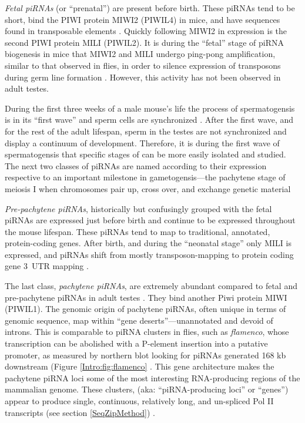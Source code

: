{    \textit{Fetal piRNAs} (or ``prenatal'') are present before birth. These piRNAs tend to be short, bind the PIWI protein MIWI2 (PIWIL4) in mice, and have sequences found in transposable elements \citep{Carmell2007}. Quickly following MIWI2 in expression is the second PIWI protein MILI (PIWIL2). It is during the ``fetal'' stage of piRNA biogenesis in mice that MIWI2 and MILI undergo ping-pong amplification, similar to that observed in flies, in order to silence expression of transposons during germ line formation \citep{Kuramochi-Miyagawa2004, Aravin2006, Aravin2008a,Aravin2008}. However, this activity has not been observed in adult testes.

    During the first three weeks of a male mouse's life the process of spermatogensis is in its ``first wave'' and sperm cells are synchronized \citep{Oakberg1956b, Laiho2013a}. After the first wave, and for the rest of the adult lifespan, sperm in the testes are not synchronized and display a continuum of development. Therefore, it is during the first wave of spermatogensis that specific stages of can be more easily isolated and studied. The next two classes of piRNAs are named according to their expression respective to an important milestone in gametogensis---the pachytene stage of meiosis I when chromosomes pair up, cross over, and exchange genetic material 

    \textit{Pre-pachytene piRNAs}, historically but confusingly grouped with the fetal piRNAs are expressed just before birth and continue to be expressed throughout the mouse lifespan. These piRNAs tend to map to traditional, annotated, protein-coding genes. After birth, and during the ``neonatal stage'' only MILI is expressed, and piRNAs shift from mostly transposon-mapping to protein coding gene 3\textprime~UTR mapping \citep{Robine2009}.

    The last class, \textit{pachytene piRNAs}, are extremely abundant compared to fetal and pre-pachytene piRNAs in adult testes \citep{Girard2006, Lau2006, Li2013h}. They bind another Piwi protein MIWI (PIWIL1). The genomic origin of pachytene piRNAs, often unique in terms of genomic sequence, map within ``gene deserts''---unannotated and devoid of introns. This is comparable to piRNA clusters in flies, such as \textit{flamenco}, whose transcription can be abolished with a P-element insertion into a putative promoter, as measured by northern blot looking for piRNAs generated 168 kb downstream (Figure \ref{Intro:fig:flamenco} \citep{Brennecke2007,Goriaux2014}. This gene architecture makes the pachytene piRNA loci some of the most interesting RNA-producing regions of the mammalian genome. These clusters, (aka: ``piRNA-producing loci'' or ``genes'') appear to produce single, continuous, relatively long, and un-spliced Pol II transcripts (see section \ref{SeqZipMethod}) \citep{Li2013h}. 

}
